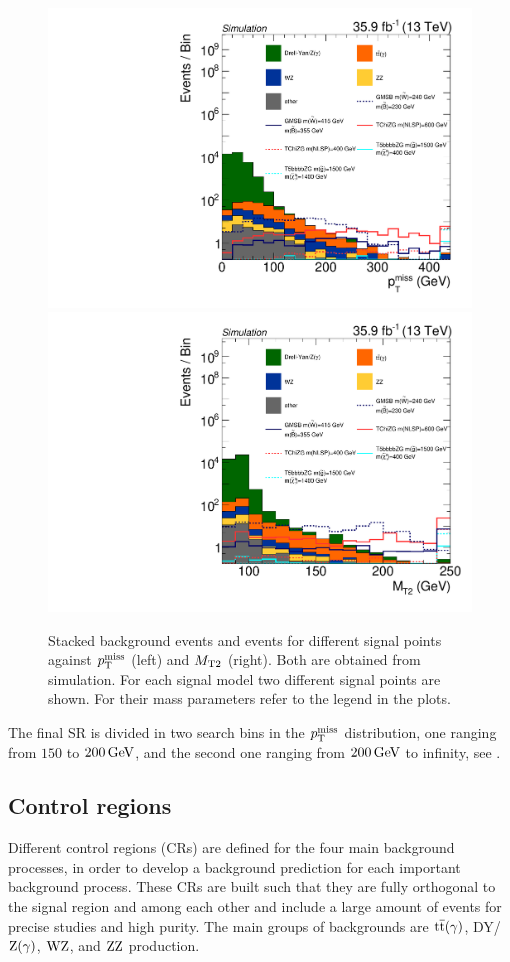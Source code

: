 \begin{figure}[tbp]
 \centering
 \includegraphics[width=\pairwidth]{figures/plots/onZ_LL_met_log}
 \includegraphics[width=\pairwidth]{figures/plots/onZ_LL_mt2_log}
 \caption{Stacked background events and events for different signal points against $p_{\mathrm{T}}^\text{miss}$ (left) and $M_{\mathrm{T2}}$ (right). Both are obtained from simulation. For each signal model two different signal points are shown. For their mass parameters refer to the legend in the plots.}
 \label{fig:SRvariables}
\end{figure}
The final SR is divided in two search bins in the $p_{\mathrm{T}}^\text{miss}$ distribution, one ranging from $150$ to $200\,\text{Ge\hspace{-.08em}V}$, and the second one ranging from $200\,\text{Ge\hspace{-.08em}V}$ to infinity, see .

\subsection{Control regions}\label{sec:CR}
Different control regions (CRs) are defined for the four main background processes, in order to develop a background prediction for each important background process. These CRs are built such that they are fully orthogonal to the signal region and among each other and include a large amount of events for precise studies and high purity. The main groups of backgrounds are ${\mathrm{t}\overline{\mathrm{t}}}(\gamma)$, DY/$\mathrm{Z}(\gamma)$, $\mathrm{W}\mathrm{Z}$, and $\mathrm{Z}\mathrm{Z}$ production.

